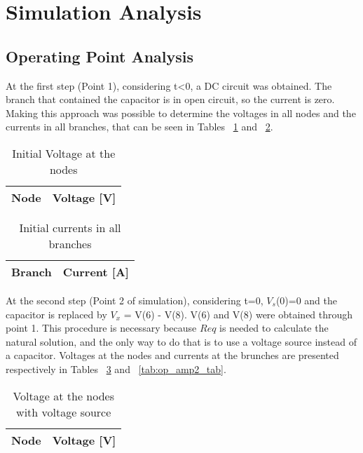 \newpage
\section{Simulation Analysis}
\label{sec:simulation}

\subsection{Operating Point Analysis}
\label{sec:Operating}
At the first step (Point 1), considering t<0, a DC circuit was obtained. The branch that contained the capacitor is in open circuit, so the current is zero. Making this approach was possible to determine the voltages in all nodes and the currents in all branches, that can be seen in Tables ~\ref{tab:op_volt1_tab} and ~\ref{tab:op_amp1_tab}.

\begin{table}[h]
  \centering
  \begin{tabular}{|l|r|}
    \hline    
    {\bf Node} & {\bf Voltage [V]} \\ \hline
    
  \end{tabular}
  \caption{Initial Voltage at the nodes}
  \label{tab:op_volt1_tab}
\end{table}

\begin{table}[h]
  \centering
  \begin{tabular}{|l|r|}
    \hline    
    {\bf Branch} & {\bf Current [A]} \\ \hline
    
  \end{tabular}
  \caption{Initial currents in all branches}
  \label{tab:op_amp1_tab}
\end{table}


\newpage
At the second step (Point 2 of simulation), considering t=0, $V_s$(0)=0 and the capacitor is replaced by $V_x$ = V(6) - V(8). V(6) and V(8) were obtained through point 1. This procedure is necessary because $Req$ is needed to calculate the natural solution, and the only way  to do that is to use a voltage source instead of a capacitor.  
Voltages at the nodes and currents at the brunches are presented respectively in Tables ~\ref{tab:op_volt2_tab} and ~\ref{tab:op_amp2_tab}. 

\begin{table}[h]
  \centering
  \begin{tabular}{|l|r|}
    \hline    
    {\bf Node} & {\bf Voltage [V]} \\ \hline
    
  \end{tabular}
  \caption{Voltage at the nodes with voltage source}
  \label{tab:op_volt2_tab}
\end{table}

